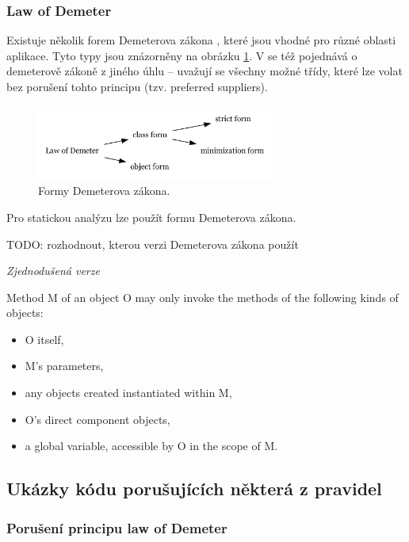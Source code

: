\subsubsection{Law of Demeter}

Existuje několik forem Demeterova zákona \cite{35588}, které jsou vhodné pro různé oblasti aplikace. Tyto typy jsou znázorněny na obrázku \ref{demeter_law_types}. V \cite{35588} se též pojednává o demeterově zákoně z jiného úhlu -- uvažují se všechny možné třídy, které lze volat bez porušení tohto principu (tzv. preferred suppliers).

\begin{figure}[h!]
  \centering
  \includegraphics[width=0.7\textwidth]{./graphs/demeter_law_types.png}
  \caption{Formy Demeterova zákona.\label{demeter_law_types}}
\end{figure}

Pro statickou analýzu lze použít  formu Demeterova zákona.

TODO: rozhodnout, kterou verzi Demeterova zákona použít

\emph{Zjednodušená verze \cite{wiki:lod}}

Method M of an object O may only invoke the methods of the following kinds of objects:

\begin{itemize}
\item O itself,
\item M's parameters,
\item any objects created instantiated within M,
\item O's direct component objects,
\item a global variable, accessible by O in the scope of M.
\end{itemize}

\subsection{Ukázky kódu porušujících některá z pravidel}

\subsubsection{Porušení principu law of Demeter}

